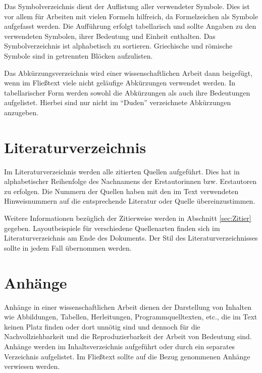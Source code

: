 Das Symbolverzeichnis dient der Auflistung aller verwendeter Symbole. Dies ist vor allem für Arbeiten mit vielen Formeln hilfreich, da Formelzeichen als Symbole aufgefasst werden. Die Aufführung erfolgt tabellarisch und sollte Angaben zu den verwendeten Symbolen, ihrer Bedeutung und Einheit enthalten. Das Symbolverzeichnis ist alphabetisch zu sortieren. Griechische und römische Symbole sind in getrennten Blöcken aufzulisten.

Das Abkürzungsverzeichnis wird einer wissenschaftlichen Arbeit dann beigefügt, wenn im Fließtext viele nicht geläufige Abkürzungen verwendet werden. In tabellarischer Form werden sowohl die Abkürzungen als auch ihre Bedeutungen aufgelistet. Hierbei sind nur nicht im "`Duden"' verzeichnete Abkürzungen anzugeben. 

\section{Literaturverzeichnis}
\label{sec:Literatur}

Im Literaturverzeichnis werden alle zitierten Quellen aufgeführt. Dies hat in alphabetischer Reihenfolge des Nachnamens der Erstautorinnen bzw. Erstautoren zu erfolgen. Die Nummern der Quellen haben mit den im Text verwendeten Hinweisnummern auf die entsprechende Literatur oder Quelle übereinzustimmen.

Weitere Informationen bezüglich der Zitierweise werden in Abschnitt \ref{sec:Zitier} gegeben. Layoutbeispiele für verschiedene Quellenarten finden sich im Literaturverzeichnis am Ende des Dokuments. Der Stil des Literaturverzeichnisses sollte in jedem Fall übernommen werden.

\section{Anhänge}
\label{sec:Anhänge}

Anhänge in einer wissenschaftlichen Arbeit dienen der Darstellung von Inhalten wie Abbildungen, Tabellen, Herleitungen, Programmquelltexten, etc., die im Text keinen Platz finden oder dort unnötig sind und dennoch für die Nachvollziehbarkeit und die Reproduzierbarkeit der Arbeit von Bedeutung sind. Anhänge werden im Inhaltsverzeichnis aufgeführt oder durch ein separates Verzeichnis aufgelistet. Im Fließtext sollte auf die Bezug genommenen Anhänge verwiesen werden.

